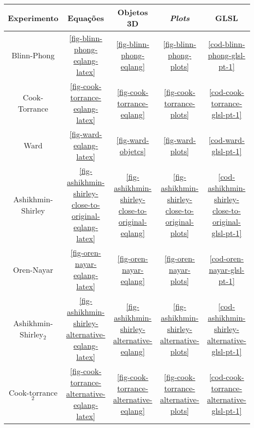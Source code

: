 \begin{table}[h!]
\centering
\begin{tabular}{|c|c|c|c|c|}
\hline
    \textbf{Experimento} & \textbf{Equações}                                                & \textbf{Objetos 3D}                                       & \textbf{\textit{Plots}}                                  & \textbf{GLSL}  \\ \hline
    Blinn-Phong          & \autoref{fig-blinn-phong-eqlang-latex}                           & \autoref{fig-blinn-phong-eqlang}                          & \autoref{fig-blinn-phong-plots}                          &                  \autoref{cod-blinn-phong-glsl-pt-1}              \\ \hline
    Cook-Torrance        & \autoref{fig-cook-torrance-eqlang-latex}                         & \autoref{fig-cook-torrance-eqlang}                        & \autoref{fig-cook-torrance-plots}                        &             \autoref{cod-cook-torrance-glsl-pt-1}              \\ \hline
    Ward                 & \autoref{fig-ward-eqlang-latex}                                  & \autoref{fig-ward-objetcs}                                & \autoref{fig-ward-plots}                                 &                     \autoref{cod-ward-glsl-pt-1}               \\ \hline
    Ashikhmin-Shirley    & \autoref{fig-ashikhmin-shirley-close-to-original-eqlang-latex}   & \autoref{fig-ashikhmin-shirley-close-to-original-eqlang}  & \autoref{fig-ashikhmin-shirley-close-to-original-plots}  &                  \autoref{cod-ashikhmin-shirley-close-to-original-glsl-pt-1}              \\ \hline
    Oren-Nayar           & \autoref{fig-oren-nayar-eqlang-latex}                            & \autoref{fig-oren-nayar-eqlang}                           & \autoref{fig-oren-nayar-plots}                           &                \autoref{cod-oren-nayar-glsl-pt-1}              \\ \hline
    Ashikhmin-Shirley$_2$& \autoref{fig-ashikhmin-shirley-alternative-eqlang-latex}         & \autoref{fig-ashikhmin-shirley-alternative-eqlang}        & \autoref{fig-ashikhmin-shirley-alternative-plots}        &                  \autoref{cod-ashikhmin-shirley-alternative-glsl-pt-1}              \\ \hline
    Cook-torrance$_2$    & \autoref{fig-cook-torrance-alternative-eqlang-latex}             & \autoref{fig-cook-torrance-alternative-eqlang}            & \autoref{fig-cook-torrance-alternative-plots}            & \autoref{cod-cook-torrance-alternative-glsl-pt-1}              \\ \hline

\end{tabular}
\end{table}
